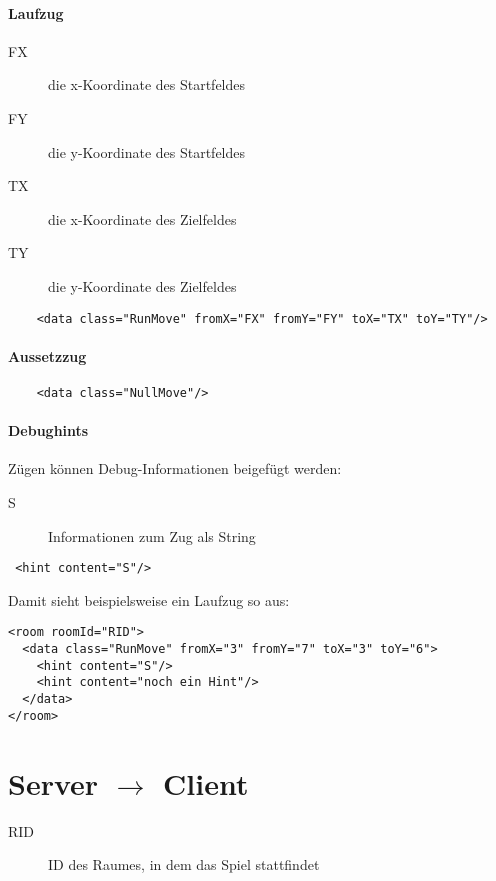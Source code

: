 \documentclass[12pt,a4paper, ngerman, oneside]{scrartcl}
\begin{document}
\subsection{Laufzug}
\label{runMove}
\begin{description}
\item[FX] die x-Koordinate des Startfeldes
\item[FY] die y-Koordinate des Startfeldes
\item[TX] die x-Koordinate des Zielfeldes
\item[TY] die y-Koordinate des Zielfeldes
\end{description}
\begin{verbatim}
	<data class="RunMove" fromX="FX" fromY="FY" toX="TX" toY="TY"/>
\end{verbatim}

\subsection{Aussetzzug}
\label{nullMove}
\begin{verbatim}
	<data class="NullMove"/>
\end{verbatim}


\subsection{Debughints}
Zügen können Debug-Informationen beigefügt werden:
\begin{description}
\item[S] Informationen zum Zug als String
\end{description}
\begin{verbatim}
 <hint content="S"/>
\end{verbatim}
Damit sieht beispielsweise ein Laufzug so aus:
\begin{verbatim}
<room roomId="RID">
  <data class="RunMove" fromX="3" fromY="7" toX="3" toY="6">
    <hint content="S"/>
    <hint content="noch ein Hint"/>
  </data>
</room>
\end{verbatim}



\newpage
\part{Server $\rightarrow$ Client}
\begin{description}
\item[RID] ID des Raumes, in dem das Spiel stattfindet
\end{description}
\end{document}
